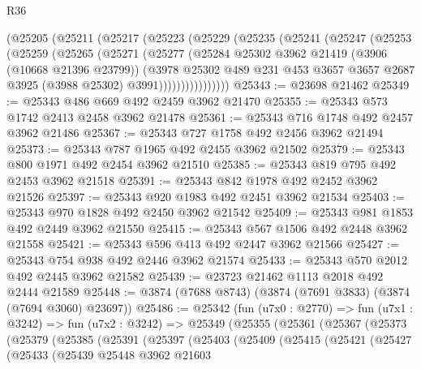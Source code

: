 \begin{lexlean}{R36}
\begin{coremodule}
      (@25205
        (@25211
          (@25217
            (@25223
              (@25229
                (@25235
                  (@25241
                    (@25247
                      (@25253
                        (@25259
                          (@25265
                            (@25271
                              (@25277
                                (@25284
                                  @25302
                                  @3962
                                  @21419
                                  (@3906 (@10668 @21396 @23799))
                                  (@3978
                                    @25302
                                    @489
                                    @231
                                    @453
                                    @3657
                                    @3657
                                    @2687
                                    @3925
                                    (@3988 @25302)
                                    @3991))))))))))))))))
@25343 := @23698 @21462
@25349 := @25343 @486 @669 @492 @2459 @3962 @21470
@25355 := @25343 @573 @1742 @2413 @2458 @3962 @21478
@25361 := @25343 @716 @1748 @492 @2457 @3962 @21486
@25367 := @25343 @727 @1758 @492 @2456 @3962 @21494
@25373 := @25343 @787 @1965 @492 @2455 @3962 @21502
@25379 := @25343 @800 @1971 @492 @2454 @3962 @21510
@25385 := @25343 @819 @795 @492 @2453 @3962 @21518
@25391 := @25343 @842 @1978 @492 @2452 @3962 @21526
@25397 := @25343 @920 @1983 @492 @2451 @3962 @21534
@25403 := @25343 @970 @1828 @492 @2450 @3962 @21542
@25409 := @25343 @981 @1853 @492 @2449 @3962 @21550
@25415 := @25343 @567 @1506 @492 @2448 @3962 @21558
@25421 := @25343 @596 @413 @492 @2447 @3962 @21566
@25427 := @25343 @754 @938 @492 @2446 @3962 @21574
@25433 := @25343 @570 @2012 @492 @2445 @3962 @21582
@25439 := @23723 @21462 @1113 @2018 @492 @2444 @21589
@25448 := @3874 (@7688 @8743) (@3874 (@7691 @3833) (@3874 (@7694 @3060) @23697))
@25486 := @25342
    (fun (u7x0 : @2770) =>
    fun (u7x1 : @3242) =>
    fun (u7x2 : @3242) =>
    @25349
      (@25355
        (@25361
          (@25367
            (@25373
              (@25379
                (@25385
                  (@25391
                    (@25397
                      (@25403
                        (@25409
                          (@25415
                            (@25421
                              (@25427
                                (@25433
                                  (@25439
                                    @25448
                                    @3962
                                    @21603

\end{coremodule}
\end{lexlean}
